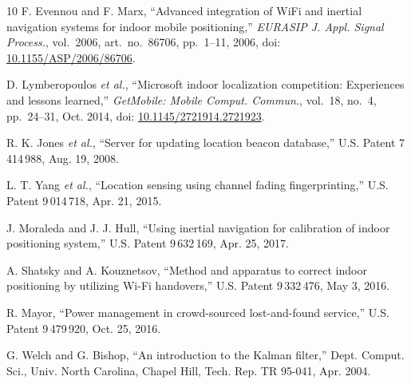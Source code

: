 \documentclass[12pt,letterpaper]{article}
\begin{document}
\begin{thebibliography}{10}
F. Evennou and F. Marx, ``Advanced integration of WiFi and inertial navigation systems for indoor
mobile positioning,'' \emph{EURASIP J. Appl. Signal Process.}, vol.~2006, art.~no.~86706,
pp.~1--11, 2006, doi: \url{10.1155/ASP/2006/86706}.

D. Lymberopoulos \emph{et al.}, ``Microsoft indoor localization competition: Experiences and
lessons learned,'' \emph{GetMobile: Mobile Comput.
Commun.}, vol.~18, no.~4, pp.~24--31, Oct. 2014, doi: \url{10.1145/2721914.2721923}.

R. K. Jones \emph{et al.}, ``Server for updating location beacon database,'' U.S. Patent 7\,414\,988, Aug. 19, 2008.

L. T. Yang \emph{et al.}, ``Location sensing using channel fading fingerprinting,'' U.S.
Patent 9\,014\,718, Apr. 21, 2015.

J. Moraleda and J. J. Hull, ``Using inertial navigation for calibration of indoor positioning
system,'' U.S. Patent 9\,632\,169, Apr. 25, 2017.

A. Shatsky and A. Kouznetsov, ``Method and apparatus to correct indoor positioning by utilizing
Wi-Fi handovers,'' U.S. Patent 9\,332\,476, May 3, 2016.

R. Mayor, ``Power management in crowd-sourced lost-and-found service,'' U.S. Patent
9\,479\,920, Oct. 25, 2016.

G. Welch and G. Bishop, ``An introduction to the Kalman filter,'' Dept. Comput. Sci., Univ. North
Carolina, Chapel Hill, Tech. Rep. TR 95-041, Apr. 2004.

\end{thebibliography}
\end{document}
